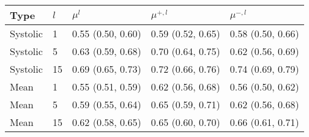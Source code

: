 \begin{tabular}{l l p{} p{} p{}}
\toprule
Type & $l$ & $\mu^{l}$ & $\mu^{+, l}$ & $\mu^{-, l}$ \\
\midrule
Systolic & 1 & {0.55 (0.50, 0.60)} & {0.59 (0.52, 0.65)} & {0.58 (0.50, 0.66)} \\
Systolic & 5 & {0.63 (0.59, 0.68)} & {0.70 (0.64, 0.75)} & {0.62 (0.56, 0.69)} \\
Systolic & 15 & {0.69 (0.65, 0.73)} & {0.72 (0.66, 0.76)} & {0.74 (0.69, 0.79)} \\
Mean & 1 & {0.55 (0.51, 0.59)} & {0.62 (0.56, 0.68)} & {0.56 (0.50, 0.62)} \\
Mean & 5 & {0.59 (0.55, 0.64)} & {0.65 (0.59, 0.71)} & {0.62 (0.56, 0.68)} \\
Mean & 15 & {0.62 (0.58, 0.65)} & {0.65 (0.60, 0.70)} & {0.66 (0.61, 0.71)} \\
\bottomrule
\end{tabular}
